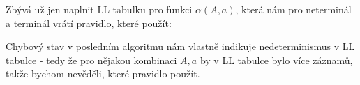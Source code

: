 \noindent
Zbývá už jen naplnit LL tabulku pro funkci $\alpha(A, a)$, která nám pro neterminál
a terminál vrátí pravidlo, které použít:\\
\begin{algorithm}[H]
  \caption{$\alpha(A, a)$}

  \BlankLine
\end{algorithm}
\vspace{0.5cm}

Chybový stav v posledním algoritmu nám vlastně indikuje nedeterminismus
v LL tabulce - tedy že pro nějakou kombinaci $A, a$ by v LL tabulce bylo
více záznamů, takže bychom nevěděli, které pravidlo použít.\\

